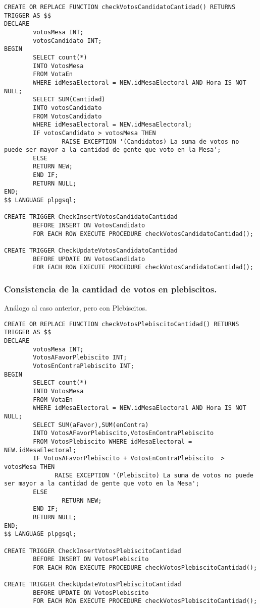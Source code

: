 \begin{verbatim}
CREATE OR REPLACE FUNCTION checkVotosCandidatoCantidad() RETURNS TRIGGER AS $$
DECLARE
        votosMesa INT;
        votosCandidato INT; 
BEGIN
        SELECT count(*)
        INTO VotosMesa 
        FROM VotaEn 
        WHERE idMesaElectoral = NEW.idMesaElectoral AND Hora IS NOT NULL;
        SELECT SUM(Cantidad) 
        INTO votosCandidato 
        FROM VotosCandidato 
        WHERE idMesaElectoral = NEW.idMesaElectoral;
        IF votosCandidato > votosMesa THEN
                RAISE EXCEPTION '(Candidatos) La suma de votos no puede ser mayor a la cantidad de gente que voto en la Mesa';
        ELSE
        RETURN NEW;
        END IF;
        RETURN NULL;
END;
$$ LANGUAGE plpgsql;

CREATE TRIGGER CheckInsertVotosCandidatoCantidad
        BEFORE INSERT ON VotosCandidato
        FOR EACH ROW EXECUTE PROCEDURE checkVotosCandidatoCantidad();

CREATE TRIGGER CheckUpdateVotosCandidatoCantidad
        BEFORE UPDATE ON VotosCandidato
        FOR EACH ROW EXECUTE PROCEDURE checkVotosCandidatoCantidad();

\end{verbatim}

\subsubsection{Consistencia de la cantidad de votos en plebiscitos.}

\indent Análogo al caso anterior, pero con Plebiscitos.\\

\begin{verbatim}
CREATE OR REPLACE FUNCTION checkVotosPlebiscitoCantidad() RETURNS TRIGGER AS $$
DECLARE
        votosMesa INT;
        VotosAFavorPlebiscito INT; 
        VotosEnContraPlebiscito INT;
BEGIN
        SELECT count(*) 
        INTO VotosMesa 
        FROM VotaEn 
        WHERE idMesaElectoral = NEW.idMesaElectoral AND Hora IS NOT NULL;
        SELECT SUM(aFavor),SUM(enContra) 
        INTO VotosAFavorPlebiscito,VotosEnContraPlebiscito 
        FROM VotosPlebiscito WHERE idMesaElectoral = NEW.idMesaElectoral;
        IF VotosAFavorPlebiscito + VotosEnContraPlebiscito  > votosMesa THEN
              RAISE EXCEPTION '(Plebiscito) La suma de votos no puede ser mayor a la cantidad de gente que voto en la Mesa';
        ELSE
                RETURN NEW;
        END IF;
        RETURN NULL;
END;
$$ LANGUAGE plpgsql;

CREATE TRIGGER CheckInsertVotosPlebiscitoCantidad
        BEFORE INSERT ON VotosPlebiscito
        FOR EACH ROW EXECUTE PROCEDURE checkVotosPlebiscitoCantidad();

CREATE TRIGGER CheckUpdateVotosPlebiscitoCantidad
        BEFORE UPDATE ON VotosPlebiscito
        FOR EACH ROW EXECUTE PROCEDURE checkVotosPlebiscitoCantidad();
\end{verbatim}
\newpage

